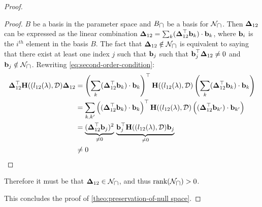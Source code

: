 \documentclass{article} %
\newcommand{\hessian}{\vH}
\newcommand{\rank}{\mbox{rank}}
\begin{document}
\begin{proof}
\begin{proof}
    
    $B$ be a basis in the parameter space and $B_{\mbox{$\cap$}}$ be a basis for $\mathcal{N}_{\mbox{$\cap$}}$. Then $\mbox{$\mbox{$\boldsymbol{\Delta}$}$}_{12}$ can be expressed as the linear combination $\mbox{$\mbox{$\boldsymbol{\Delta}$}$}_{12} = \sum_{k} (\mbox{$\mbox{$\boldsymbol{\Delta}$}$}_{12}^\top \mbox{$\mbox{$\mathbf{b}$}$}_k) \cdot \mbox{$\mbox{$\mathbf{b}$}$}_k$, where $\mbox{$\mbox{$\mathbf{b}$}$}_i$ is the $i^{th}$ element in the basis $B$. The fact that $\mbox{$\mbox{$\boldsymbol{\Delta}$}$}_{12} \notin \mathcal{N}_{\mbox{$\cap$}}$ is equivalent to saying that there exist at least one index $j$ such that $\mbox{$\mbox{$\mathbf{b}$}$}_j$ such that $\mbox{$\mbox{$\mathbf{b}$}$}_j^\top \mbox{$\mbox{$\boldsymbol{\Delta}$}$}_{12} \neq 0$ and $\mbox{$\mbox{$\mathbf{b}$}$}_j \notin \mathcal{N}_{\mbox{$\cap$}}$. Rewriting \cref{eq:second-order-condition}: 
    \begin{align*}
        \vDelta_{12}^\top\hessian((l_{12}(\lambda), \data)\vDelta_{12} 
        & = \rnd{\sum_{k} (\vDelta_{12}^\top \vb_k) \cdot \vb_k}^\top \hessian((l_{12}(\lambda), \data)\rnd{\sum_{k} (\vDelta_{12}^\top \vb_k) \cdot \vb_k}\\
        & = \sum_{k, k'} \rnd{ (\vDelta_{12}^\top \vb_k) \cdot \vb_k}^\top \hessian((l_{12}(\lambda), \data)\rnd{ (\vDelta_{12}^\top \vb_{k'}) \cdot \vb_{k'}}\\
        & = \underbrace{(\vDelta_{12}^\top \vb_j)^2}_{\neq 0}\, \underbrace{\vb_j^\top \hessian((l_{12}(\lambda), \data)\vb_{j}}_{\neq 0} \\
        & \neq 0
    \end{align*}
\end{proof} 


Therefore it must be that $\mbox{$\mbox{$\boldsymbol{\Delta}$}$}_{12} \in \mathcal{N}_{\mbox{$\cap$}}$, and thus $\rank(\mathcal{N}_{\intersect}) > 0$. 

This concludes the proof of \cref{theo:preservation-of-null space}. 
\end{proof}
\end{document}
